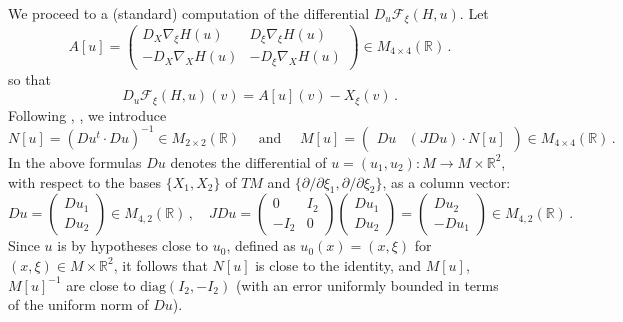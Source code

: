 \documentclass[11pt]{amsart}
\newcommand \R {{ \mathbb R}}
\begin{document}
We proceed to a (standard) computation of the differential $D_u \mathcal{F}_\xi(H, u)$.
Let 
$$
A[u] = \begin{pmatrix} D_X \nabla_\xi H (u)  &  D_\xi \nabla_\xi H (u)\\ -  D_X \nabla_X H (u)  & - D_\xi \nabla_X H (u) \end{pmatrix}  \in M_{4\times 4} (\R)\,.
$$
so that
$$
D_u \mathcal{F}_\xi(H, u) (v) = A[u] (v) - X_\xi (v) \,.
$$
Following \cite{AlSh}, \cite{LGJV05}, we introduce
$$
N[u] =  (Du^t \cdot Du)^{-1} \in M_{2\times 2} (\R) \quad \text{ and } \quad   M[u] = \begin{pmatrix}  Du &  (JDu) \cdot N[u] \end{pmatrix} \in M_{4\times 4}(\R) \,.
$$
In the above formulas $Du$ denotes the differential of $u = (u_1, u_2): M \to M \times \R^2$, with respect to the bases $\{X_1, X_2\}$ of $TM$ and $\{ \partial / \partial \xi_1,
\partial / \partial \xi_2\}$,   as a column vector:
$$
Du = \begin{pmatrix}    Du_1   \\   D u_2 \end{pmatrix}   \in  M_{4, 2} (\R)\,, \quad JDu= \begin{pmatrix} 0 & I_2 \\-I_2 & 0 \end{pmatrix}  \begin{pmatrix}    Du_1   \\   D u_2 \end{pmatrix}
=  \begin{pmatrix}    Du_2   \\   -D u_1 \end{pmatrix} \in  M_{4, 2} (\R)\,.
$$
Since $u$ is by hypotheses close to $u_0$, defined as $u_0(x)= (x, \xi)$  for $(x, \xi) \in M \times \R^2$, it follows that $N[u]$ is close to the identity, and $M[u]$, $M[u]^{-1}$
are close to $\text{diag}(I_2, -I_2)$  (with an error uniformly bounded in terms of the  uniform  norm of $Du$).
\end{document}
